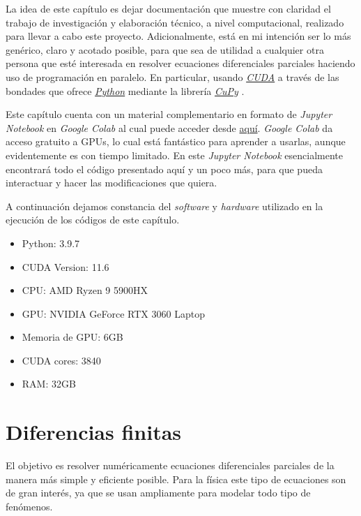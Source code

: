 \graphicspath{{figs/cap2_bis}}

La idea de este capítulo es dejar documentación que muestre con claridad el trabajo de investigación y elaboración técnico, a nivel computacional, realizado 
para llevar a cabo este proyecto. Adicionalmente, está en mi intención ser lo más genérico, claro y acotado posible, para que sea de utilidad a cualquier 
otra persona que esté interesada en resolver ecuaciones diferenciales parciales haciendo uso de programación en paralelo. En particular, usando 
\href{https://developer.nvidia.com/cuda-toolkit}{\textit{CUDA}} \cite{cuda} a través de las bondades que ofrece \href{https://www.python.org/}{\textit{Python}} \cite{python} mediante 
la librería \href{https://cupy.dev/}{\textit{CuPy}} \cite{cupy}.

Este capítulo cuenta con un material complementario en formato de \textit{Jupyter Notebook} en \textit{Google Colab} al cual puede acceder desde 
\href{https://colab.research.google.com/drive/13dfbe0GnIngJ2q3w2jLOlSO6mtFYZmA7?usp=sharing}{aquí}. \textit{Google Colab} da acceso gratuito a GPUs,
lo cual está fantástico para aprender a usarlas, aunque evidentemente es con tiempo limitado. En este \textit{Jupyter Notebook} esencialmente 
encontrará todo el código presentado aquí y un poco más, para que pueda interactuar y hacer las modificaciones que quiera.

A continuación dejamos constancia del \textit{software} y \textit{hardware} utilizado en la ejecución de los códigos de este capítulo.

\begin{itemize}
  \item Python: 3.9.7
  \item CUDA Version: 11.6
  \item CPU: AMD Ryzen 9 5900HX
  \item GPU: NVIDIA GeForce RTX 3060 Laptop
  \item Memoria de GPU: 6GB
  \item CUDA cores: 3840
  \item RAM: 32GB
\end{itemize}

\section{Diferencias finitas}
\label{S:diferencias finitas}

El objetivo es resolver numéricamente ecuaciones diferenciales parciales de la manera más simple y eficiente posible. Para la física este tipo de ecuaciones son de gran 
interés, ya que se usan ampliamente para modelar todo tipo de fenómenos. 

